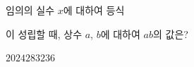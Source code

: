 임의의 실수 $x$에 대하여 등식 \par\smallskip{}\par\smallskip\noindent 이 성립할 때, 상수 $a$, $b$에 대하여 $ab$의 값은? 
\begin{choices32}{$20$}{$24$}{$28$}{$32$}{$36$}\end{choices32}
